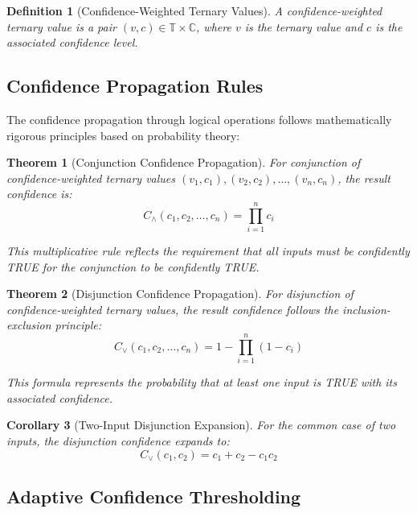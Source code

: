 \documentclass[11pt,a4paper]{article}
\newtheorem{theorem}{Theorem}
\newtheorem{corollary}[theorem]{Corollary}
\newtheorem{definition}{Definition}
\begin{document}
\begin{definition}[Confidence-Weighted Ternary Values]
A confidence-weighted ternary value is a pair $(v, c) \in \mathbb{T} \times \mathbb{C}$, where $v$ is the ternary value and $c$ is the associated confidence level.
\end{definition}

\subsection{Confidence Propagation Rules}

The confidence propagation through logical operations follows mathematically rigorous principles based on probability theory:

\begin{theorem}[Conjunction Confidence Propagation]
For conjunction of confidence-weighted ternary values $(v_1, c_1), (v_2, c_2), \ldots, (v_n, c_n)$, the result confidence is:
\begin{equation}
C_{\land}(c_1, c_2, \ldots, c_n) = \prod_{i=1}^n c_i
\end{equation}

This multiplicative rule reflects the requirement that all inputs must be confidently TRUE for the conjunction to be confidently TRUE.
\end{theorem}

\begin{theorem}[Disjunction Confidence Propagation]
For disjunction of confidence-weighted ternary values, the result confidence follows the inclusion-exclusion principle:
\begin{equation}
C_{\lor}(c_1, c_2, \ldots, c_n) = 1 - \prod_{i=1}^n (1 - c_i)
\end{equation}

This formula represents the probability that at least one input is TRUE with its associated confidence.
\end{theorem}

\begin{corollary}[Two-Input Disjunction Expansion]
For the common case of two inputs, the disjunction confidence expands to:
\begin{equation}
C_{\lor}(c_1, c_2) = c_1 + c_2 - c_1 c_2
\end{equation}
\end{corollary}

\subsection{Adaptive Confidence Thresholding}
\end{document}

